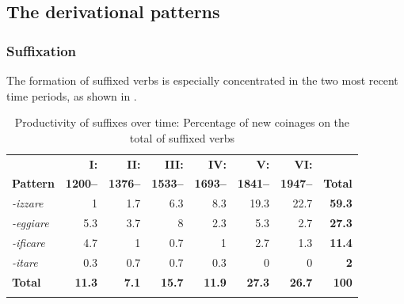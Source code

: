 \documentclass[output=paper,colorlinks,citecolor=brown]{langscibook}
\begin{document}
 \subsection{The derivational patterns} \label{sec:pattern}
\subsubsection{Suffixation} 

The formation of suffixed verbs is especially concentrated in the two most recent time periods, as shown in .


\begin{table}
\caption{Productivity of suffixes over time: Percentage of new coinages on the total of suffixed verbs}
\label{tab:key:4}
\begin{tabularx}{\textwidth}{Xrrrrrrr}
\lsptoprule
 &  \textbf{I:}  &  \textbf{II:}  &  \textbf{III:}  & \textbf{IV:}  & \textbf{V:} &  \textbf{VI:}  & \\
  \textbf{Pattern} &   \textbf{1200–} &  \textbf{1376–} &  \textbf{1533–} &  \textbf{1693–} &  \textbf{1841–} &  \textbf{1947–} & \textbf{Total}\\
  \midrule
\textit{-izzare} & 1 & 1.7 & 6.3 &  8.3 & 19.3 & {22.7} & {\textbf{59.3}}\\
\textit{-eggiare} & 5.3 & 3.7 & 8 & 2.3 & 5.3 & {2.7} & {\textbf{27.3}}\\
\textit{-ificare} & 4.7 & 1 & 0.7 & 1 & 2.7 & {1.3} & {\textbf{11.4}}\\
{\textit{-itare}} & {0.3} & {0.7} & {0.7} & {0.3} & {0} & {0} & {\textbf{2}}\\
\midrule
{\textbf{Total}} & {\textbf{11.3}} & {\textbf{7.1}} & {\textbf{15.7}} & {\textbf{11.9}} & {\textbf{27.3}} & {\textbf{26.7}} & {\textbf{100}}\\
\lspbottomrule
\end{tabularx}
\end{table}
\end{document}
